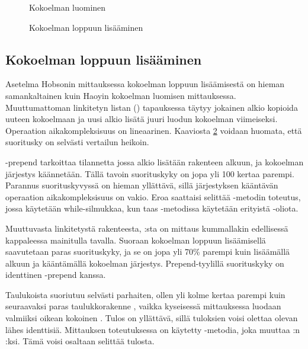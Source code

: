 \begin{figure}[h]
    \centering
    
    \caption{Kokoelman luominen}\label{kokoelmanLuominen_kaavio}
\end{figure}


\begin{figure}[h]
    \centering
    
    \caption{Kokoelman loppuun lisääminen}\label{kokoelmanLoppuunLisaaminen_kaavio}
\end{figure}

\subsection{Kokoelman loppuun lisääminen}
Asetelma Hobsonin mittauksessa\cite{hobsonBenchmark} kokoelman loppuun lisäämisestä on hieman samankaltainen kuin Haoyin\cite{haoyiBenchmark} kokoelman luomisen mittauksessa. Muuttumattoman linkitetyn listan () tapauksessa täytyy jokainen alkio kopioida uuteen kokoelmaan ja uusi alkio lisätä juuri luodun kokoelman viimeiseksi. Operaation aikakompleksisuus on lineaarinen. Kaaviosta \ref{kokoelmanLoppuunLisaaminen_kaavio} voidaan huomata, että suoritusky on selvästi vertailun heikoin.

-prepend tarkoittaa tilannetta jossa alkio lisätään rakenteen alkuun, ja kokoelman järjestys käännetään. Tällä tavoin suorituskyky on jopa yli 100 kertaa parempi. Parannus suorituskyvyssä on hieman yllättävä, sillä järjestyksen kääntävän operaation aikakompleksisuus on vakio. Eroa saattaisi selittää -metodin toteutus, jossa käytetään while-silmukkaa, kun taas \code{:+}-metodissa käytetään erityistä -oliota.

Muuttuvasta linkitetystä rakenteesta, :sta on mittaus kummallakin edellisessä kappaleessa mainitulla tavalla. Suoraan kokoelman loppuun lisäämisellä saavutetaan paras suorituskyky, ja se on jopa yli 70\% parempi kuin lisäämällä alkuun ja kääntämällä kokoelman järjestys. Prepend-tyylillä suorituskyky on identtinen -prepend kanssa. 

Taulukoista  suoriutuu selvästi parhaiten, ollen yli kolme kertaa parempi kuin seuraavaksi paras taulukkorakenne , vaikka kyseisessä mittauksessa luodaan valmiiksi oikean kokoinen . Tulos on yllättävä, sillä tuloksien voisi olettaa olevan lähes identtisiä. Mittauksen \cite{hobsonBenchmark} toteutuksessa on käytetty -metodia, joka muuttaa :n :ksi. Tämä voisi osaltaan selittää tulosta.

